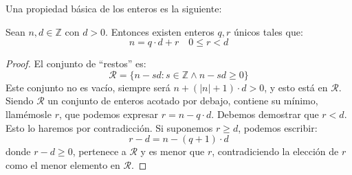   Una propiedad básica de los enteros es la siguiente:
  \begin{theorem}
    \label{theo:division}
    Sean \(n, d \in \mathbb{Z}\)
    con \(d > 0\).
    Entonces existen enteros \(q, r\) únicos tales que:
    \begin{equation*}
      n = q \cdot d + r \quad 0 \le r < d
    \end{equation*}
  \end{theorem}
  \begin{proof}
    El conjunto de ``restos'' es:
    \begin{equation}
      \mathcal{R} = \{n - s d \colon s \in \mathbb{Z} \wedge n - s d \ge 0\}
    \end{equation}
    Este conjunto no es vacío,
    siempre será \(n + (\lvert n \rvert + 1) \cdot d > 0\),
    y esto está en \(\mathcal{R}\).
    Siendo \(\mathcal{R}\) un conjunto de enteros acotado por debajo,
    contiene su mínimo,
    llamémosle \(r\),
    que podemos expresar \(r = n - q \cdot d\).
    Debemos demostrar que \(r < d\).
    Esto lo haremos por contradicción.%
    Si suponemos \(r \ge d\),
    podemos escribir:
    \begin{equation*}
      r - d = n - (q + 1) \cdot d
    \end{equation*}
    donde \(r - d \ge 0\),
    pertenece a \(\mathcal{R}\)
    y es menor que \(r\),
    contradiciendo la elección de \(r\) como el menor elemento
    en \(\mathcal{R}\).


\end{proof}
